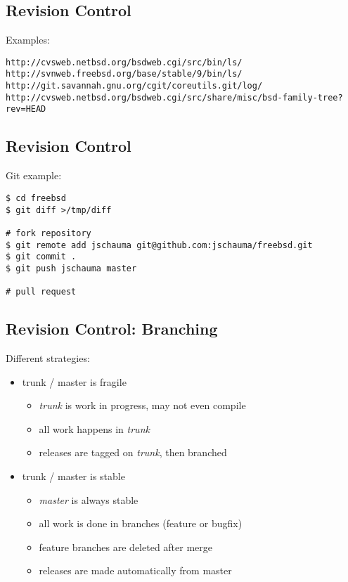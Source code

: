 \documentclass[xga]{xdvislides}
\begin{document}
\subsection{Revision Control}
Examples:

{\tt http://cvsweb.netbsd.org/bsdweb.cgi/src/bin/ls/} \\

{\tt http://svnweb.freebsd.org/base/stable/9/bin/ls/} \\

{\tt http://git.savannah.gnu.org/cgit/coreutils.git/log/} \\

{\tt http://cvsweb.netbsd.org/bsdweb.cgi/src/share/misc/bsd-family-tree?rev=HEAD}

\subsection{Revision Control}
Git example:
\begin{verbatim}
$ cd freebsd
$ git diff >/tmp/diff

# fork repository
$ git remote add jschauma git@github.com:jschauma/freebsd.git
$ git commit .
$ git push jschauma master

# pull request
\end{verbatim}


\subsection{Revision Control: Branching}
Different strategies:
\begin{itemize}
	\item trunk / master is fragile
		\begin{itemize}
			\item {\em trunk} is work in progress, may not even compile
			\item all work happens in {\em trunk}
			\item releases are tagged on {\em trunk}, then branched
		\end{itemize}
	\item trunk / master is stable
		\begin{itemize}
			\item {\em master} is always stable
			\item all work is done in branches (feature or bugfix)
			\item feature branches are deleted after merge
			\item releases are made automatically from master
		\end{itemize}
\end{itemize}
\end{document}
